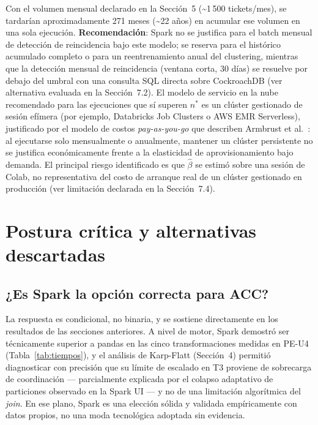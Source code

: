 \documentclass[11pt]{article}
\begin{document}
Con el volumen mensual declarado en la Sección~5
(\textasciitilde1\,500 tickets/mes), se tardarían aproximadamente 271
meses (\textasciitilde22 años) en acumular ese volumen en una sola
ejecución. \textbf{Recomendación}: Spark no se justifica para el batch
mensual de detección de reincidencia bajo este modelo; se reserva para
el histórico acumulado completo o para un reentrenamiento anual del
clustering, mientras que la detección mensual de reincidencia (ventana
corta, 30 días) se resuelve por debajo del umbral con una consulta SQL
directa sobre CockroachDB (ver alternativa evaluada en la
Sección~7.2). El modelo de servicio en la nube recomendado para las
ejecuciones que sí superen $n^{*}$ es un clúster gestionado de sesión
efímera (por ejemplo, Databricks Job Clusters o AWS EMR Serverless),
justificado por el modelo de costos \emph{pay-as-you-go} que describen
Armbrust et al.~\cite{armbrust2010}: al ejecutarse solo mensualmente o
anualmente, mantener un clúster persistente no se justifica
económicamente frente a la elasticidad de aprovisionamiento bajo
demanda. El principal riesgo identificado es que $\hat\beta$ se estimó
sobre una sesión de Colab, no representativa del costo de arranque real
de un clúster gestionado en producción (ver limitación declarada en la
Sección~7.4).


\section{Postura crítica y alternativas descartadas}

\subsection{¿Es Spark la opción correcta para ACC?}

La respuesta es condicional, no binaria, y se sostiene directamente en
los resultados de las secciones anteriores. A nivel de motor, Spark
demostró ser técnicamente superior a pandas en las cinco
transformaciones medidas en PE-U4 (Tabla~\ref{tab:tiempos}), y el
análisis de Karp-Flatt (Sección~4) permitió diagnosticar con precisión
que su límite de escalado en T3 proviene de sobrecarga de coordinación
--- parcialmente explicada por el colapso adaptativo de particiones
observado en la Spark UI --- y no de una limitación algorítmica del
\emph{join}. En ese plano, Spark es una elección sólida y validada
empíricamente con datos propios, no una moda tecnológica adoptada sin
evidencia.
\end{document}
